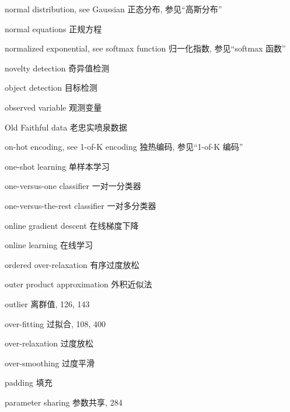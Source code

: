 normal distribution, see Gaussian  正态分布, 参见“高斯分布” \par
normal equations  正规方程 \par
normalized exponential, see softmax function  归一化指数, 参见“softmax 函数” \par
novelty detection  奇异值检测 \par
object detection  目标检测 \par
observed variable  观测变量 \par
Old Faithful data  老忠实喷泉数据 \par
on-hot encoding, see 1-of-K encoding  独热编码, 参见“1-of-K 编码” \par
one-shot learning  单样本学习 \par
one-versus-one classifier  一对一分类器 \par
one-versus-the-rest classifier  一对多分类器 \par
online gradient descent  在线梯度下降 \par
online learning  在线学习 \par
ordered over-relaxation  有序过度放松 \par
outer product approximation  外积近似法 \par
outlier  离群值, 126, 143 \par
over-fitting  过拟合, 108, 400 \par
over-relaxation  过度放松 \par
over-smoothing  过度平滑 \par
padding  填充 \par
parameter sharing  参数共享, 284 \par

